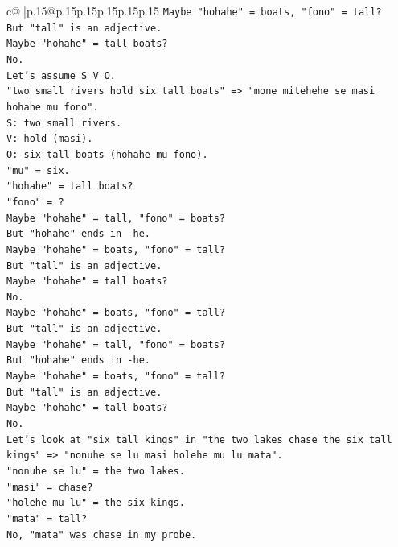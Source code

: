 \documentclass{article}
\begin{document}
{\begin{supertabular}{c@{$\;$}|p{.15\linewidth}@{}p{.15\linewidth}p{.15\linewidth}p{.15\linewidth}p{.15\linewidth}p{.15\linewidth}}
{{{\texttt{Maybe "hohahe" = boats, "fono" = tall?} \\
\texttt{But "tall" is an adjective.} \\
\texttt{Maybe "hohahe" = tall boats?} \\
\texttt{No.} \\
\texttt{Let's assume S V O.} \\
\texttt{"two small rivers hold six tall boats" => "mone mitehehe se masi hohahe mu fono".} \\
\texttt{S: two small rivers.} \\
\texttt{V: hold (masi).} \\
\texttt{O: six tall boats (hohahe mu fono).} \\
\texttt{"mu" = six.} \\
\texttt{"hohahe" = tall boats?} \\
\texttt{"fono" = ?} \\
\texttt{Maybe "hohahe" = tall, "fono" = boats?} \\
\texttt{But "hohahe" ends in {-}he.} \\
\texttt{Maybe "hohahe" = boats, "fono" = tall?} \\
\texttt{But "tall" is an adjective.} \\
\texttt{Maybe "hohahe" = tall boats?} \\
\texttt{No.} \\
\texttt{Maybe "hohahe" = boats, "fono" = tall?} \\
\texttt{But "tall" is an adjective.} \\
\texttt{Maybe "hohahe" = tall, "fono" = boats?} \\
\texttt{But "hohahe" ends in {-}he.} \\
\texttt{Maybe "hohahe" = boats, "fono" = tall?} \\
\texttt{But "tall" is an adjective.} \\
\texttt{Maybe "hohahe" = tall boats?} \\
\texttt{No.} \\
\texttt{Let's look at "six tall kings" in "the two lakes chase the six tall kings" => "nonuhe se lu masi holehe mu lu mata".} \\
\texttt{"nonuhe se lu" = the two lakes.} \\
\texttt{"masi" = chase?} \\
\texttt{"holehe mu lu" = the six kings.} \\
\texttt{"mata" = tall?} \\
\texttt{No, "mata" was chase in my probe.} \\
}}}
\end{supertabular}}
\end{document}
